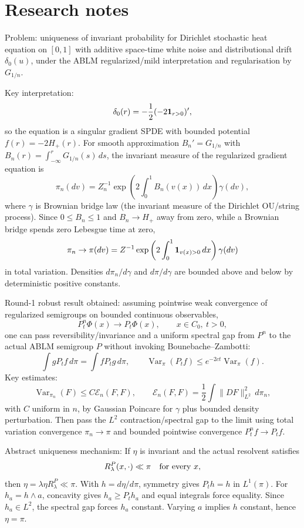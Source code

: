 \documentclass[12pt]{article}
\begin{document}
\section*{Research notes}

Problem: uniqueness of invariant probability for Dirichlet stochastic heat
equation on $[0,1]$ with additive space-time white noise and distributional
drift $\delta_0(u)$, under the ABLM regularized/mild interpretation and
regularisation by $G_{1/n}$.

Key interpretation:
\[
\delta_0(r)=-\frac12(-2{\bf1}_{r>0})',
\]
so the equation is a singular gradient SPDE with bounded potential
$f(r)=-2H_+(r)$.  For smooth approximation $B_n'=G_{1/n}$ with
$B_n(r)=\int_{-\infty}^rG_{1/n}(s)\,ds$, the invariant measure of the
regularized gradient equation is
\[
\pi_n(dv)=Z_n^{-1}\exp\left(2\int_0^1 B_n(v(x))\,dx\right)\gamma(dv),
\]
where $\gamma$ is Brownian bridge law (the invariant measure of the
Dirichlet OU/string process).  Since $0\le B_n\le1$ and $B_n\to H_+$
away from zero, while a Brownian bridge spends zero Lebesgue time at
zero,
\[
\pi_n\to
\pi(dv)=Z^{-1}\exp\left(2\int_0^1{\bf1}_{v(x)>0}\,dx\right)\gamma(dv)
\]
in total variation.  Densities $d\pi_n/d\gamma$ and $d\pi/d\gamma$ are
bounded above and below by deterministic positive constants.

Round-1 robust result obtained: assuming pointwise weak convergence of
regularized semigroups on bounded continuous observables,
\[
P_t^n\Phi(x)\to P_t\Phi(x),\qquad x\in C_0,\ t>0,
\]
one can pass reversibility/invariance and a uniform spectral gap from
$P^n$ to the actual ABLM semigroup $P$ without invoking
Bounebache--Zambotti:
\[
\int gP_tf\,d\pi=\int fP_tg\,d\pi,\qquad
\operatorname{Var}_\pi(P_tf)\le e^{-2ct}\operatorname{Var}_\pi(f).
\]
Key estimates:
\[
\operatorname{Var}_{\pi_n}(F)\le C\mathcal E_n(F,F),\qquad
\mathcal E_n(F,F)=\frac12\int\|DF\|_{L^2}^2\,d\pi_n,
\]
with $C$ uniform in $n$, by Gaussian Poincare for $\gamma$ plus bounded
density perturbation.  Then pass the $L^2$ contraction/spectral gap to
the limit using total variation convergence $\pi_n\to\pi$ and bounded
pointwise convergence $P_t^nf\to P_tf$.

Abstract uniqueness mechanism:
If $\eta$ is invariant and the actual resolvent satisfies
\[
R_\lambda^P(x,\cdot)\ll\pi\quad\hbox{for every }x,
\]
then $\eta=\lambda\eta R_\lambda^P\ll\pi$.  With $h=d\eta/d\pi$,
symmetry gives $P_th=h$ in $L^1(\pi)$.  For $h_a=h\wedge a$, concavity
gives $h_a\ge P_th_a$ and equal integrals force equality.  Since
$h_a\in L^2$, the spectral gap forces $h_a$ constant.  Varying $a$
implies $h$ constant, hence $\eta=\pi$.
\end{document}
